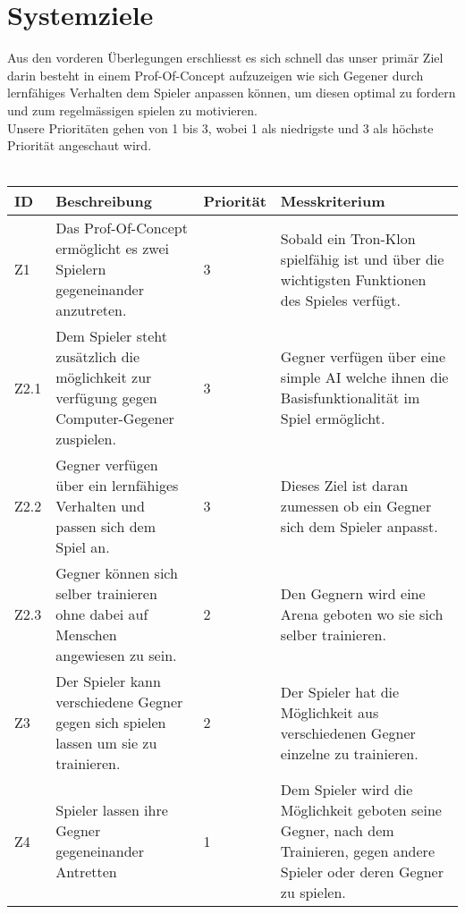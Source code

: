 \section{Systemziele}

Aus den vorderen Überlegungen erschliesst es sich schnell das unser primär Ziel darin besteht in einem Prof-Of-Concept aufzuzeigen wie sich Gegener durch lernfähiges Verhalten dem Spieler anpassen können, um diesen optimal zu fordern und zum regelmässigen spielen zu motivieren.  
\\ 
Unsere Prioritäten gehen von 1 bis 3, wobei 1 als niedrigste und 3 als höchste Priorität angeschaut wird.
\\\\
\begin{tabularx}{\textwidth}{| p{0.7cm} | X | p{1.5cm} | X |}
\hline
\rowcolor[gray]{0.9} ID & Beschreibung & Priorität & Messkriterium\\
\hline
Z1 & Das Prof-Of-Concept ermöglicht es zwei Spielern gegeneinander anzutreten. & 3 & Sobald ein Tron-Klon spielfähig ist und über die wichtigsten Funktionen des Spieles verfügt.\\
\hline
Z2.1 & Dem Spieler steht zusätzlich die möglichkeit zur verfügung gegen Computer-Gegener zuspielen. & 3 & Gegner verfügen über eine simple AI welche ihnen die Basisfunktionalität im Spiel ermöglicht. \\
\hline
Z2.2 & Gegner verfügen über ein lernfähiges Verhalten und passen sich dem Spiel an. & 3 & Dieses Ziel ist daran zumessen ob ein Gegner sich dem Spieler anpasst. \\
\hline 
Z2.3 & Gegner können sich selber trainieren ohne dabei auf Menschen angewiesen zu sein.  & 2 & Den Gegnern wird eine Arena geboten wo sie sich selber trainieren. \\
\hline
Z3 & Der Spieler kann verschiedene Gegner gegen sich spielen lassen um sie zu trainieren. & 2 & Der Spieler hat die Möglichkeit aus verschiedenen Gegner einzelne zu trainieren. \\
\hline
Z4 & Spieler lassen ihre Gegner gegeneinander Antretten & 1 & Dem Spieler wird die Möglichkeit geboten seine Gegner, nach dem Trainieren, gegen andere Spieler oder deren Gegner zu spielen. \\
\hline
\end{tabularx}